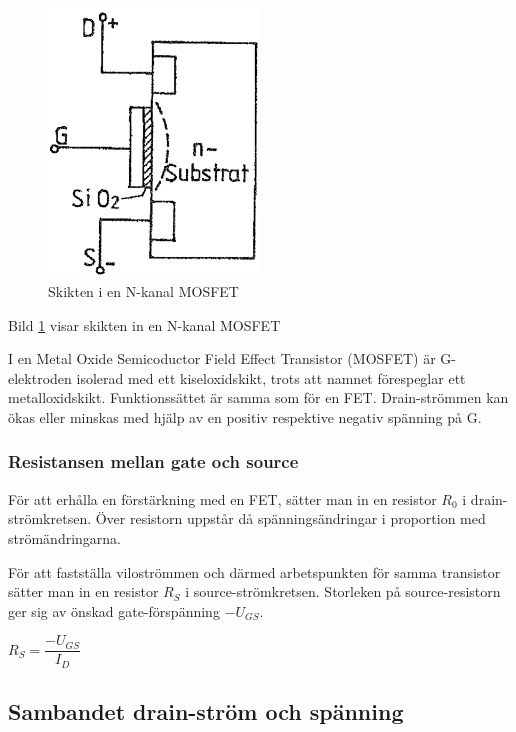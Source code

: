 \begin{figure}
\includegraphics[width=0.5\textwidth]{images/cropped_pdfs/bild_2_2-22.pdf}
\caption{Skikten i en N-kanal MOSFET}
\label{fig:BildII2-22}
\end{figure}


Bild \ref{fig:BildII2-22} visar skikten in en N-kanal MOSFET

I en Metal Oxide Semicoductor Field Effect Transistor (MOSFET) är
G-elektroden isolerad med ett kiseloxidskikt, trots att namnet förespeglar
ett metalloxidskikt. Funktionssättet är samma som för en FET.
Drain-strömmen kan ökas eller minskas med hjälp av en
positiv respektive negativ spänning på G.

\subsubsection{Resistansen mellan gate och source}

För att erhålla en förstärkning med en FET, sätter man in en resistor
\(R_0\) i drain-strömkretsen.
Över resistorn uppstår då spänningsändringar i proportion med strömändringarna.

För att fastställa viloströmmen och därmed arbetspunkten för samma transistor
sätter man in en resistor \(R_S\) i source-strömkretsen.
Storleken på source-resistorn ger sig av önskad gate-förspänning \(-U_{GS}\).

\(R_S = \dfrac{-U_{GS}}{I_D}\)

\subsection{Sambandet drain-ström och spänning}

